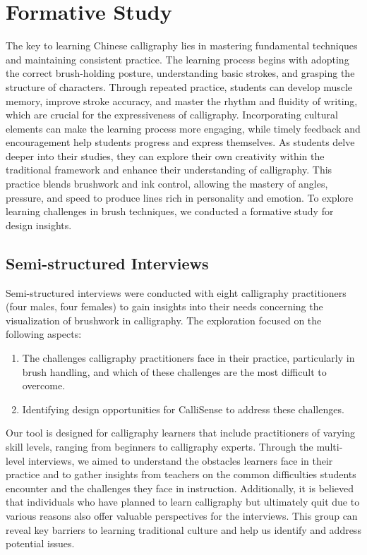 \section{Formative Study}
The key to learning Chinese calligraphy lies in mastering fundamental techniques and maintaining consistent practice. The learning process begins with adopting the correct brush-holding posture, understanding basic strokes, and grasping the structure of characters\cite{zhang2023bringing, shi2019chinese}. Through repeated practice, students can develop muscle memory, improve stroke accuracy, and master the rhythm and fluidity of writing, which are crucial for the expressiveness of calligraphy. Incorporating cultural elements can make the learning process more engaging, while timely feedback and encouragement help students progress and express themselves\cite{hue2010aestheticism}. As students delve deeper into their studies, they can explore their own creativity within the traditional framework and enhance their understanding of calligraphy. This practice blends brushwork and ink control, allowing the mastery of angles, pressure, and speed to produce lines rich in personality and emotion\cite{chiang1974chinese}. To explore learning challenges in brush techniques, we conducted a formative study for design insights.


\subsection{Semi-structured Interviews}
Semi-structured interviews were conducted with eight calligraphy practitioners (four males, four females) to gain insights into their needs concerning the visualization of brushwork in calligraphy. The exploration focused on the following aspects:
\begin{enumerate}
    \item The challenges calligraphy practitioners face in their practice, particularly in brush handling, and which of these challenges are the most difficult to overcome.
    \item Identifying design opportunities for CalliSense to address these challenges.
\end{enumerate}

Our tool is designed for calligraphy learners that include practitioners of varying skill levels, ranging from beginners to calligraphy experts. Through the multi-level interviews, we aimed to understand the obstacles learners face in their practice and to gather insights from teachers on the common difficulties students encounter and the challenges they face in instruction. Additionally, it is believed that individuals who have planned to learn calligraphy but ultimately quit due to various reasons also offer valuable perspectives for the interviews. This group can reveal key barriers to learning traditional culture and help us identify and address potential issues.

